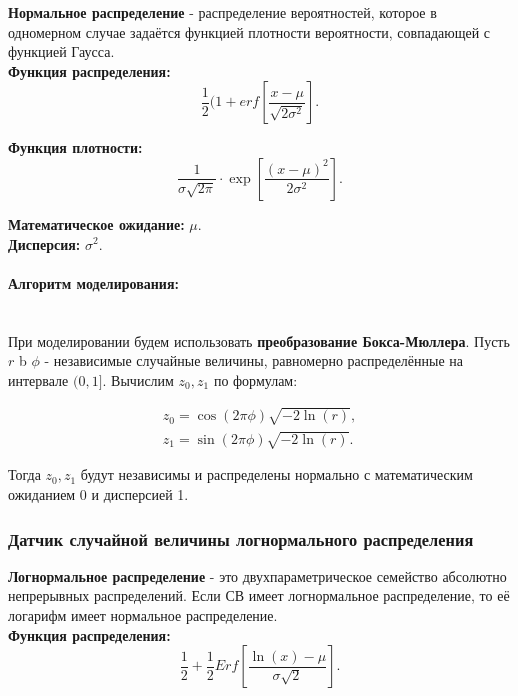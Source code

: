 \textbf{Нормальное распределение} -  распределение вероятностей, которое в одномерном случае задаётся функцией плотности вероятности, совпадающей с функцией Гаусса.\\

\textbf{Функция распределения:}
\begin{equation}
	\frac{1}{2}(1+erf\left[\frac{x-\mu}{\sqrt{2\sigma^{2}}}\right].
\end{equation}

\textbf{Функция плотности:}
\begin{equation}
	\frac{1}{\sigma\sqrt{2\pi}} \cdot \exp\left[\frac{(x-\mu)^{2}}{2\sigma^{2}}\right].
\end{equation}

\textbf{Математическое ожидание:} $\mu$.\\

\textbf{Дисперсия:} $\sigma^{2}$.

\paragraph{Алгоритм моделирования:}\
\\

При моделировании будем использовать \textbf{преобразование Бокса-Мюллера}. Пусть $r$ b $\phi$ - независимые случайные величины, равномерно распределённые на интервале $(0, 1]$. Вычислим $z_{0}, z_{1}$ по формулам:

\begin{equation}
  \begin{array}{l}
	z_{0} = \cos(2\pi\phi)\sqrt{-2\ln(r)},\\
	z_{1} = \sin(2\pi\phi)\sqrt{-2\ln(r)}.
  \end{array}
\end{equation}

Тогда $z_{0}, z_{1}$ будут независимы и распределены нормально с математическим ожиданием 0 и дисперсией 1.

\subsubsection{Датчик случайной величины логнормального распределения}

\textbf{Логнормальное распределение} -  это двухпараметрическое семейство абсолютно непрерывных распределений. Если СВ имеет логнормальное распределение, то её логарифм имеет нормальное распределение.\\

\textbf{Функция распределения:}
\begin{equation}
	\frac{1}{2}+\frac{1}{2} Erf\left[\frac{\ln(x) - \mu}{\sigma\sqrt{2}}\right].
\end{equation}

